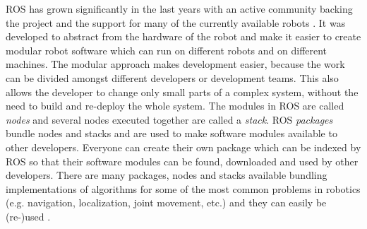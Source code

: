 \begin{figure}[ht]
\centering
{}
\end{figure}

ROS has grown significantly in the last years with an active community backing the project and the support for many of the currently available robots \cite{Foote2012}. It was developed to abstract from the hardware of the robot and make it easier to create modular robot software which can run on different robots and on different machines. The modular approach makes development easier, because the work can be divided amongst different developers or development teams. This also allows the developer to change only small parts of a complex system, without the need to build and re-deploy the whole system.
The modules in ROS are called \emph{nodes} and several nodes executed together are called a \emph{stack}. ROS \emph{packages} bundle nodes and stacks and are used to make software modules available to other developers. Everyone can create their own package which can be indexed by ROS so that their software modules can be found, downloaded and used by other developers. There are many packages, nodes and stacks available bundling implementations of algorithms for some of the most common problems in robotics (e.g. navigation, localization, joint movement, etc.) and they can easily be (re-)used \cite{Cousins2010}.

